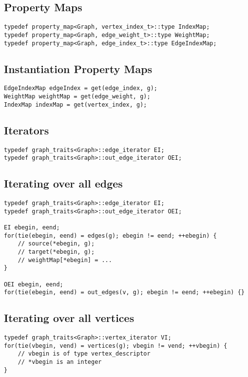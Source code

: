 \documentclass[11pt]{article}
\begin{document}
\subsection{Property Maps}
\begin{lstlisting}
typedef property_map<Graph, vertex_index_t>::type IndexMap;
typedef property_map<Graph, edge_weight_t>::type WeightMap;
typedef property_map<Graph, edge_index_t>::type EdgeIndexMap;
\end{lstlisting}

\subsection{Instantiation Property Maps}
\begin{lstlisting}
EdgeIndexMap edgeIndex = get(edge_index, g);
WeightMap weightMap = get(edge_weight, g);
IndexMap indexMap = get(vertex_index, g);
\end{lstlisting}

\subsection{Iterators}
\begin{lstlisting}
typedef graph_traits<Graph>::edge_iterator EI;
typedef graph_traits<Graph>::out_edge_iterator OEI;
\end{lstlisting}

\subsection{Iterating over all edges}
\begin{lstlisting}
typedef graph_traits<Graph>::edge_iterator EI;
typedef graph_traits<Graph>::out_edge_iterator OEI;

EI ebegin, eend;
for(tie(ebegin, eend) = edges(g); ebegin != eend; ++ebegin) {
    // source(*ebegin, g);
    // target(*ebegin, g);
    // weightMap[*ebegin] = ...
}

OEI ebegin, eend;
for(tie(ebegin, eend) = out_edges(v, g); ebegin != eend; ++ebegin) {}
\end{lstlisting}

\subsection{Iterating over all vertices}
\begin{lstlisting}
typedef graph_traits<Graph>::vertex_iterator VI;
for(tie(vbegin, vend) = vertices(g); vbegin != vend; ++vbegin) {
    // vbegin is of type vertex_descriptor
    // *vbegin is an integer
}
\end{lstlisting}
\end{document}
